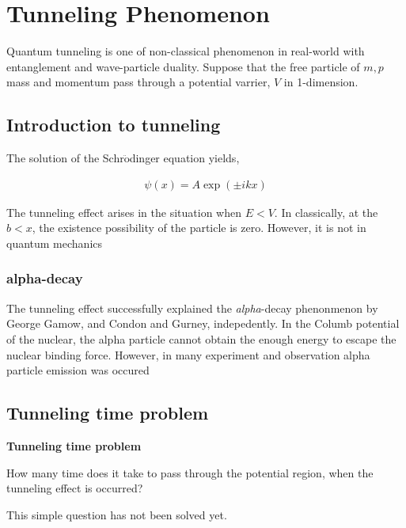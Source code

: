 \chapter{Tunneling Phenomenon}

Quantum tunneling is one of non-classical phenomenon in real-world with entanglement and wave-particle duality.
Suppose that the free particle of $m, p$ mass and momentum pass through a potential varrier, $V$ in 1-dimension.

\section{Introduction to tunneling}

\begin{figure}
    \caption{}
    \label{fig:tunneling}
\end{figure}

The solution of the Schr$\ddot{\mbox{o}}$dinger  equation yields,

\begin{eqnarray}
    \psi(x) = A \exp(\pm ikx)
\end{eqnarray}


The tunneling effect arises in the situation when $E <V$. 
In classically, at the $b<x$, the existence possibility of the particle is zero.
However, it is not in quantum mechanics


\subsection{alpha-decay}
The tunneling effect successfully explained the \textit{alpha}-decay phenonmenon by George Gamow, and Condon and Gurney, indepedently.
In the Columb potential of the nuclear, 
the alpha particle cannot obtain the enough energy 
to escape the nuclear binding force.
However, in many experiment and observation alpha particle emission was occured

\section{Tunneling time problem}

\begin{definition}{\textbf{Tunneling time problem}}

    How many time does it take to pass through the potential region, when the tunneling effect is occurred?
\end{definition}

This simple question has not been solved yet.

